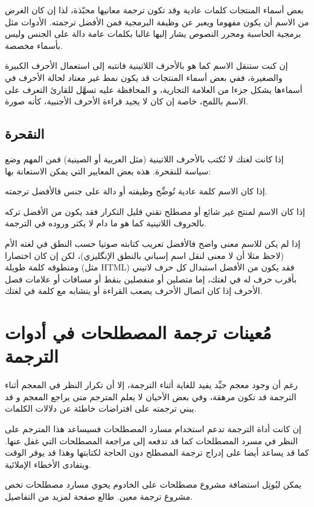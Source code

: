 بعض أسماء المنتجات كلمات عادية وقد تكون ترجمة معانيها محبّذة، لذا إن كان
الغرض من الاسم أن يكون مفهوما ويعبر عن وظيفة البرمجية فمن الأفضل
ترجمته. الأدوات مثل برمجية الحاسبة ومحرر النصوص يشار إليها غالبا بكلمات
عامة دالة على الجنس وليس بأسماء مخصصة.

إن كنت ستنقل الاسم كما هو بالأحرف اللاتينية فانتبه إلى استعمال الأحرف
الكبيرة والصغيرة، ففي بعض أسماء المنتجات قد يكون نمط غير معتاد لحالة
الأحرف في أسماءها يشكل جزءا من العلامة التجارية، و المحافظة عليه تسهَّل
للقارئ التعرف على الاسم باللمح، خاصة إن كان لا يجيد قراءة الأحرف
الأجنبية، كأنه صورة.

\subsection{النقحرة}
إذا كانت لغتك لا تُكتب بالأحرف
اللاتينية (مثل العربية أو الصينية) فمن المهم وضع سياسة للنقحرة. هذه بعض
المعايير التي يمكن الاستعانة بها:

\startitemize[1]
\item إذا كان الاسم كلمة عادية تُوضِّح وظيفته أو دالة على جنس فالأفضل
ترجمته.
\item إذا كان الاسم لمنتج غير شائع أو مصطلح تقني قليل التكرار فقد يكون
من الأفضل تركه بالحروف اللاتينية كما هو ما دام لا يكثر وروده في
الترجمة.
\item إذا لم يكن للاسم معنى واضح فالأفضل تعريب كتابته صوتيا حسب النطق في
لغته الأم (لاحظ مثلا أن لا معنى لنقل اسم إسباني بالنطق الإنگليزي)، لكن
إن كان اختصارا ومنطوقه كلمة طويلة (مثل HTML) فقد يكون من الأفضل استبدال
كل حرف لاتيني بأقرب حرف له في لغتك، إما متصلين أو منفصلين بنقط أو
مسافات أو علامات فصل الأحرف إذا كان اتصال الأحرف يصعب القراءة أو يتشابه
مع كلمة في لغتك.
\stopitemize
\section{مُعينات ترجمة المصطلحات في أدوات الترجمة}
رغم أن وجود معجم جيِّد يفيد للغاية أثناء الترجمة، إلا أن تكرار النظر في
المعجم أثناء الترجمة قد تكون مرهقة، وفي بعض الأحيان لا يعلم المترجم متى
يراجع المعجم و قد يبني ترجمته على افتراضات خاطئة عن دلالات الكلمات.

إن كانت أداة الترجمة تدعم استخدام مسارد المصطلحات فسيساعد هذا المترجم
على النظر في مسرد المصطلحات كما قد تدفعه إلى مراجعة المصطلحات التي غفل
عنها. كما قد يساعد أيضا على إدراج ترجمة المصطلح دون الحاجة لكتابتها
وهذا قد يوفر الوقت ويتفادى الأخطاء الإملائية.

يمكن لبُوتِل استضافة مشروع مصطلحات على الخادوم يحوي مسارد مصطلحات تخص
مشروع ترجمة معين. طالع صفحة  لمزيد من
التفاصيل.

